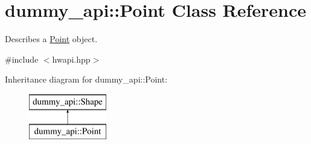 \hypertarget{classdummy__api_1_1Point}{}\section{dummy\+\_\+api\+:\+:Point Class Reference}
\label{classdummy__api_1_1Point}


Describes a \mbox{\hyperlink{classdummy__api_1_1Point}{Point}} object.  




{\ttfamily \#include $<$hwapi.\+hpp$>$}

Inheritance diagram for dummy\+\_\+api\+:\+:Point\+:\begin{figure}[H]
\begin{center}
\leavevmode
\includegraphics[height=2.000000cm]{classdummy__api_1_1Point}
\end{center}
\end{figure}
